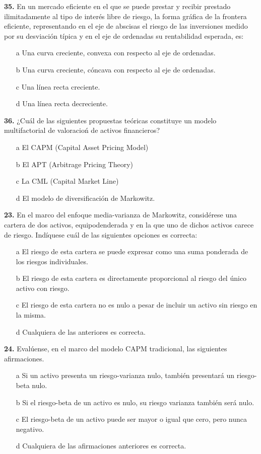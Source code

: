 \documentclass{nuevotema}
\begin{document}
\textbf{35.} En un mercado eficiente en el que se puede prestar y recibir prestado ilimitadamente al tipo de interés libre de riesgo, la forma gráfica de la frontera eficiente, representando en el eje de abscisas el riesgo de las inversiones medido por su desviación típica y en el eje de ordenadas su rentabilidad esperada, es:
\begin{enumerate}
	\item[a] Una curva creciente, convexa con respecto al eje de ordenadas.
	\item[b] Una curva creciente, cóncava con respecto al eje de ordenadas.
	\item[c] Una línea recta creciente.
	\item[d] Una línea recta decreciente.
\end{enumerate}

\textbf{36.} ¿Cuál de las siguientes propuestas teóricas constituye un modelo multifactorial de valoracioń de activos financieros?
\begin{enumerate}
	\item[a] El CAPM (Capital Asset Pricing Model)
	\item[b] El APT (Arbitrage Pricing Theory)
	\item[c] La CML (Capital Market Line)
	\item[d] El modelo de diversificación de Markowitz.
\end{enumerate}

\textbf{23.} En el marco del enfoque media-varianza de Markowitz, considérese una cartera de dos activos, equipodenderada y en la que uno de dichos activos carece de riesgo. Indíquese cuál de las siguientes opciones es correcta:
\begin{enumerate}
	\item[a] El riesgo de esta cartera se puede expresar como una suma ponderada de los riesgos individuales.
	\item[b] El riesgo de esta cartera es directamente proporcional al riesgo del único activo con riesgo.
	\item[c] El riesgo de esta cartera no es nulo a pesar de incluir un activo sin riesgo en la misma.
	\item[d] Cualquiera de las anteriores es correcta.
\end{enumerate}

\textbf{24.} Evalúense, en el marco del modelo CAPM tradicional, las siguientes afirmaciones.
\begin{enumerate}
	\item[a] Si un activo presenta un riesgo-varianza nulo, también presentará un riesgo-beta nulo.
	\item[b] Si el riesgo-beta de un activo es nulo, su riesgo varianza también será nulo.
	\item[c] El riesgo-beta de un activo puede ser mayor o igual que cero, pero nunca negativo.
	\item[d] Cualquiera de las afirmaciones anteriores es correcta. 
\end{enumerate}
\end{document}
